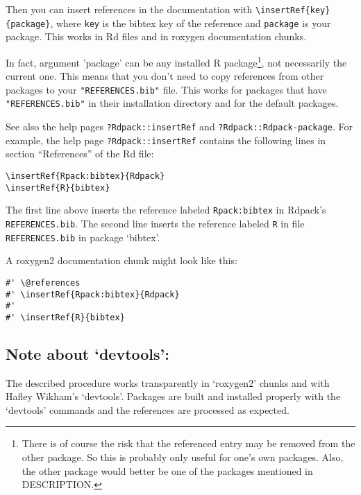 \documentclass[12pt,a4paper]{article}
\begin{document}
Then you can insert references in the documentation with \verb+\insertRef{key}{package}+,
where \verb+key+ is the bibtex key of the reference and \verb+package+ is your package.
This works in Rd files and in roxygen documentation chunks.

In fact, argument 'package' can be any installed R package\footnote{%
  There is of course the risk that the referenced entry may be removed from the other
  package. So this is probably only useful for one's own packages. Also, the other package
  would better be one of the packages mentioned in DESCRIPTION.}, not necessarily the current
one. This means that you don't need to copy references from other packages to your
\verb+"REFERENCES.bib"+ file.  This works for packages that have \verb+"REFERENCES.bib"+ in
their installation directory and for the default packages.

See also the help pages \verb+?Rdpack::insertRef+ and \verb+?Rdpack::Rdpack-package+.  For
example, the help page \verb+?Rdpack::insertRef+ contains the following lines in section
``References'' of the Rd file:
\begin{verbatim}
\insertRef{Rpack:bibtex}{Rdpack}
\insertRef{R}{bibtex}
\end{verbatim}
The first line above inserts the reference labeled \verb+Rpack:bibtex+ in Rdpack's
\verb+REFERENCES.bib+. The second line inserts the reference labeled \verb+R+ in file
\verb+REFERENCES.bib+ in package `bibtex'.

A roxygen2 documentation chunk might look like this:
\begin{verbatim}
#' \@references
#' \insertRef{Rpack:bibtex}{Rdpack}
#'
#' \insertRef{R}{bibtex}
\end{verbatim}



\subsection*{Note about `devtools':}
\label{sec:devtools}

The described procedure works transparently in `roxygen2' chunks and with Hafley Wikham's
`devtools'.  Packages are built and installed properly with the `devtools' commands and the
references are processed as expected.
\end{document}

